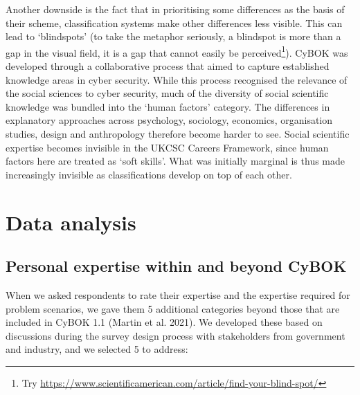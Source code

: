 \documentclass[
  a4paper,
]{book}
\begin{document}
Another downside is the fact that in prioritising some differences as
the basis of their scheme, classification systems make other differences
less visible. This can lead to `blindspots' (to take the metaphor
seriously, a blindspot is more than a gap in the visual field, it is a
gap that cannot easily be perceived\footnote{Try
  \url{https://www.scientificamerican.com/article/find-your-blind-spot/}}).
CyBOK was developed through a collaborative process that aimed to
capture established knowledge areas in cyber security. While this
process recognised the relevance of the social sciences to cyber
security, much of the diversity of social scientific knowledge was
bundled into the `human factors' category. The differences in
explanatory approaches across psychology, sociology, economics,
organisation studies, design and anthropology therefore become harder to
see. Social scientific expertise becomes invisible in the UKCSC Careers
Framework, since human factors here are treated as `soft skills'. What
was initially marginal is thus made increasingly invisible as
classifications develop on top of each other.

\section{Data analysis}\label{data-analysis-1}

\subsection{Personal expertise within and beyond
CyBOK}\label{sec-personal-expertise-within-and-beyond-cybok}

When we asked respondents to rate their expertise and the expertise
required for problem scenarios, we gave them 5 additional categories
beyond those that are included in CyBOK 1.1 (Martin et al. 2021). We
developed these based on discussions during the survey design process
with stakeholders from government and industry, and we selected 5 to
address:
\end{document}
